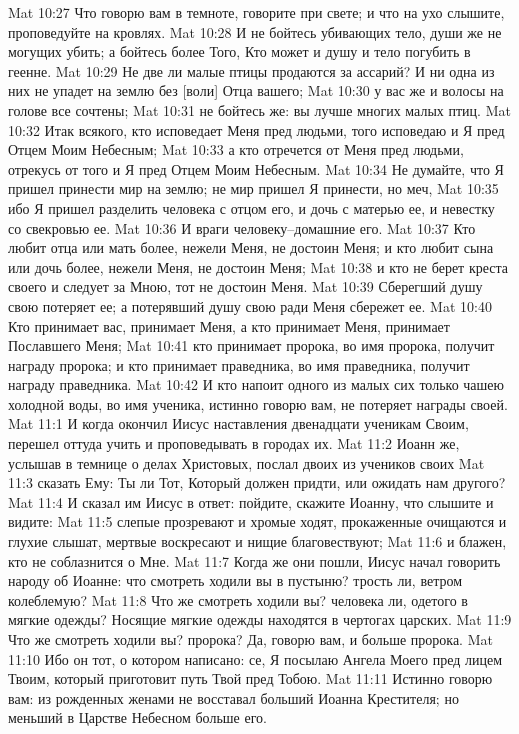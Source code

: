 Mat 10:27  Что говорю вам в темноте, говорите при свете; и что на ухо слышите, проповедуйте на кровлях.
Mat 10:28  И не бойтесь убивающих тело, души же не могущих убить; а бойтесь более Того, Кто может и душу и тело погубить в геенне.
Mat 10:29  Не две ли малые птицы продаются за ассарий? И ни одна из них не упадет на землю без [воли] Отца вашего;
Mat 10:30  у вас же и волосы на голове все сочтены;
Mat 10:31  не бойтесь же: вы лучше многих малых птиц.
Mat 10:32  Итак всякого, кто исповедает Меня пред людьми, того исповедаю и Я пред Отцем Моим Небесным;
Mat 10:33  а кто отречется от Меня пред людьми, отрекусь от того и Я пред Отцем Моим Небесным.
Mat 10:34  Не думайте, что Я пришел принести мир на землю; не мир пришел Я принести, но меч,
Mat 10:35  ибо Я пришел разделить человека с отцом его, и дочь с матерью ее, и невестку со свекровью ее.
Mat 10:36  И враги человеку--домашние его.
Mat 10:37  Кто любит отца или мать более, нежели Меня, не достоин Меня; и кто любит сына или дочь более, нежели Меня, не достоин Меня;
Mat 10:38  и кто не берет креста своего и следует за Мною, тот не достоин Меня.
Mat 10:39  Сберегший душу свою потеряет ее; а потерявший душу свою ради Меня сбережет ее.
Mat 10:40  Кто принимает вас, принимает Меня, а кто принимает Меня, принимает Пославшего Меня;
Mat 10:41  кто принимает пророка, во имя пророка, получит награду пророка; и кто принимает праведника, во имя праведника, получит награду праведника.
Mat 10:42  И кто напоит одного из малых сих только чашею холодной воды, во имя ученика, истинно говорю вам, не потеряет награды своей.
Mat 11:1  И когда окончил Иисус наставления двенадцати ученикам Своим, перешел оттуда учить и проповедывать в городах их.
Mat 11:2  Иоанн же, услышав в темнице о делах Христовых, послал двоих из учеников своих
Mat 11:3  сказать Ему: Ты ли Тот, Который должен придти, или ожидать нам другого?
Mat 11:4  И сказал им Иисус в ответ: пойдите, скажите Иоанну, что слышите и видите:
Mat 11:5  слепые прозревают и хромые ходят, прокаженные очищаются и глухие слышат, мертвые воскресают и нищие благовествуют;
Mat 11:6  и блажен, кто не соблазнится о Мне.
Mat 11:7  Когда же они пошли, Иисус начал говорить народу об Иоанне: что смотреть ходили вы в пустыню? трость ли, ветром колеблемую?
Mat 11:8  Что же смотреть ходили вы? человека ли, одетого в мягкие одежды? Носящие мягкие одежды находятся в чертогах царских.
Mat 11:9  Что же смотреть ходили вы? пророка? Да, говорю вам, и больше пророка.
Mat 11:10  Ибо он тот, о котором написано: се, Я посылаю Ангела Моего пред лицем Твоим, который приготовит путь Твой пред Тобою.
Mat 11:11  Истинно говорю вам: из рожденных женами не восставал больший Иоанна Крестителя; но меньший в Царстве Небесном больше его.
